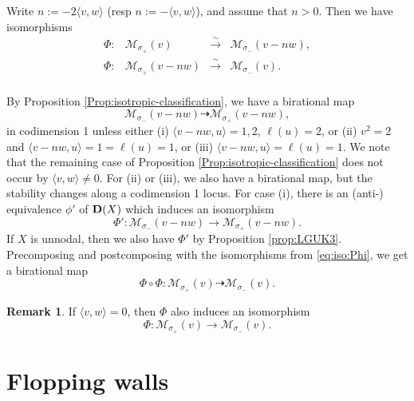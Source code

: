\documentclass[leqno,11pt]{amsart}
\theoremstyle{definition}
\newtheorem{Rem}[Thm]{Remark}
\def\MM{\ensuremath{\mathcal M}}
\newcommand{\mor}[1][]{\xrightarrow{#1}}
\newcommand{\isomor}{\mor[\sim]}
\begin{document}
Write $n:=-2\langle v,w \rangle$ (resp $n:=-\langle v,w\rangle$), and assume that $n>0$.
Then we have isomorphisms
\begin{equation}\label{eq:iso:Phi}
\begin{matrix}
\Phi:& \MM_{\sigma_+}(v)& \isomor& \MM_{\sigma_-}(v-nw),\\
\Phi:& \MM_{\sigma_+}(v-nw)& \isomor& \MM_{\sigma_-}(v).\\
\end{matrix}
\end{equation}


By Proposition \ref{Prop:isotropic-classification},
we have a birational map
$$ \MM_{\sigma_-}(v-nw) \dashrightarrow\MM_{\sigma_+}(v-nw),$$ in codimension 1
unless either 
(i) $\langle v-nw, u \rangle=1,2$, $\ell(u)=2$, or (ii) $v^2=2$ and
$\langle v-nw,u \rangle=1=\ell(u)=1$,
or (iii) $\langle v-nw,u \rangle=\ell(u)=1$.
We note that the remaining case of Proposition
\ref{Prop:isotropic-classification}
does not occur by $\langle v,w \rangle \ne 0$.
For (ii) or (iii), we also have a birational map, but the stability changes
along a codimension 1 locus.
For case (i), there is an (anti-) equivalence $\phi'$ of ${\bf D}(X)$ which induces
an isomorphism 
$$\Phi': \MM_{\sigma_-}(v-nw) \to \MM_{\sigma_+}(v-nw).$$
If $X$ is unnodal, then we also have $\Phi'$ by Proposition \ref{prop:LGUK3}. 
Precomposing and postcomposing with the isomorphisms from \eqref{eq:iso:Phi}, we get a birational map
$$
\Phi \circ \Phi:\MM_{\sigma_+}(v) \dashrightarrow \MM_{\sigma_-}(v).
$$

\begin{Rem}
If $\langle v, w \rangle=0$, then
$\Phi$ also induces an isomorphism
$$\Phi:\MM_{\sigma_+}(v) \to \MM_{\sigma_-}(v).$$
\end{Rem}







\section{Flopping walls}
\end{document}
